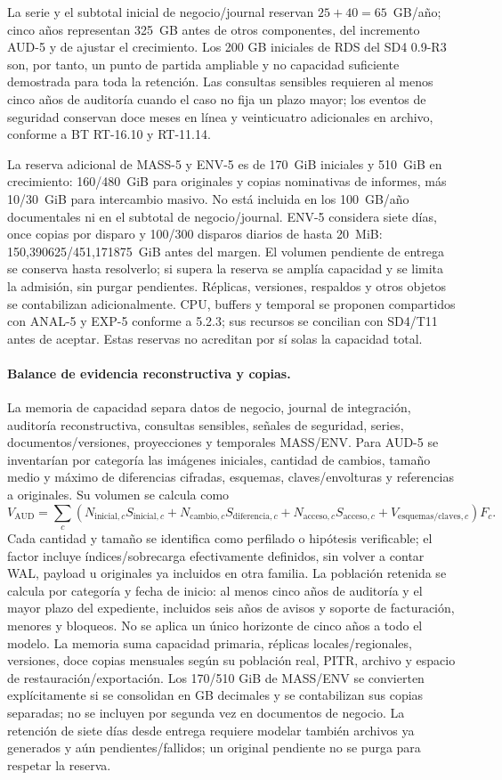 La serie y el subtotal inicial de negocio/journal reservan \(25+40=65\)~GB/año; cinco años representan 325~GB antes de otros componentes, del incremento AUD-5 y de ajustar el crecimiento. Los 200 GB iniciales de RDS del SD4 0.9-R3 son, por tanto, un punto de partida ampliable y no capacidad suficiente demostrada para toda la retención. Las consultas sensibles requieren al menos cinco años de auditoría cuando el caso no fija un plazo mayor; los eventos de seguridad conservan doce meses en línea y veinticuatro adicionales en archivo, conforme a BT RT-16.10 y RT-11.14.

La reserva adicional de MASS-5 y ENV-5 es de 170~GiB iniciales y 510~GiB en crecimiento: 160/480~GiB para originales y copias nominativas de informes, más 10/30~GiB para intercambio masivo. No está incluida en los 100~GB/año documentales ni en el subtotal de negocio/journal. ENV-5 considera siete días, once copias por disparo y 100/300 disparos diarios de hasta 20~MiB: 150,390625/451,171875~GiB antes del margen. El volumen pendiente de entrega se conserva hasta resolverlo; si supera la reserva se amplía capacidad y se limita la admisión, sin purgar pendientes. Réplicas, versiones, respaldos y otros objetos se contabilizan adicionalmente. CPU, buffers y temporal se proponen compartidos con ANAL-5 y EXP-5 conforme a 5.2.3; sus recursos se concilian con SD4/T11 antes de aceptar. Estas reservas no acreditan por sí solas la capacidad total.
\paragraph{Balance de evidencia reconstructiva y copias.}
La memoria de capacidad separa datos de negocio, journal de integración, auditoría reconstructiva, consultas sensibles, señales de seguridad, series, documentos/versiones, proyecciones y temporales MASS/ENV. Para AUD-5 se inventarían por categoría las imágenes iniciales, cantidad de cambios, tamaño medio y máximo de diferencias cifradas, esquemas, claves/envolturas y referencias a originales. Su volumen se calcula como
\[
V_{\mathrm{AUD}}=\sum_c (N_{\mathrm{inicial},c}S_{\mathrm{inicial},c}
+N_{\mathrm{cambio},c}S_{\mathrm{diferencia},c}
+N_{\mathrm{acceso},c}S_{\mathrm{acceso},c}
+V_{\mathrm{esquemas/claves},c})F_c.
\]
Cada cantidad y tamaño se identifica como perfilado o hipótesis verificable; el factor incluye índices/sobrecarga efectivamente definidos, sin volver a contar WAL, payload u originales ya incluidos en otra familia. La población retenida se calcula por categoría y fecha de inicio: al menos cinco años de auditoría y el mayor plazo del expediente, incluidos seis años de avisos y soporte de facturación, menores y bloqueos. No se aplica un único horizonte de cinco años a todo el modelo.
La memoria suma capacidad primaria, réplicas locales/regionales, versiones, doce copias mensuales según su población real, PITR, archivo y espacio de restauración/exportación. Los 170/510 GiB de MASS/ENV se convierten explícitamente si se consolidan en GB decimales y se contabilizan sus copias separadas; no se incluyen por segunda vez en documentos de negocio. La retención de siete días desde entrega requiere modelar también archivos ya generados y aún pendientes/fallidos; un original pendiente no se purga para respetar la reserva.

